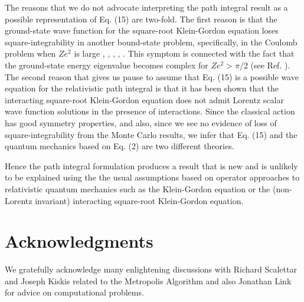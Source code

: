 The reasons that we do not advocate interpreting the path integral
result as a possible representation of Eq. (15) are two-fold.
The first reason is that the ground-state wave function for the 
square-root Klein-Gordon equation loses square-integrability
in another bound-state problem, specifically, 
in the Coulomb problem when $Ze^2$ 
is large \cite{bib:nickisch}, \cite{bib:durand}, \cite{bib:castorina},
\cite{bib:friar}, \cite{bib:hardekopf}. 
This symptom is connected with the fact that the 
ground-state energy eigenvalue becomes complex for $Ze^2 > \pi/2$ 
(see Ref. \cite{bib:herbst}). 
The second reason that gives us pause to assume that Eq. (15) is 
a possible wave equation for the relativistic path integral is
that it has been shown \cite{bib:sucher}
that the interacting square-root Klein-Gordon equation does not 
admit Lorentz sca\-lar wave function solutions 
in the presence of interactions. Since the classical action 
has good symmetry properties, and also, 
since we see no evidence of 
loss of square-integrability from the Monte Carlo results, we 
infer that Eq. (15) and the
quantum mechanics based on Eq. (2) are two different theories.

Hence the path integral formulation produces a result that is 
new and is unlikely to be explained using the the usual assumptions based on 
operator approaches to relativistic quantum mechanics such as the
Klein-Gordon equation or the (non-Lorentz invariant) interacting   
square-root Klein-Gordon equation.

\section{Acknowledgments}
We gratefully acknowledge many enlightening discussions with 
Richard Scalettar and Joseph Kiskis related to the Metropolis Algorithm
and also Jonathan Link for advice on computational problems. 

